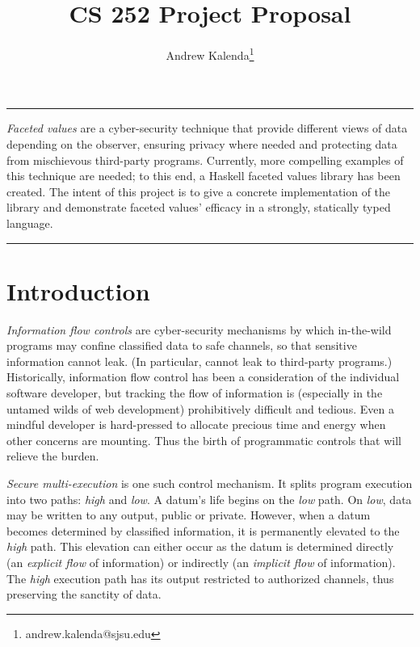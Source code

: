 \documentclass[12pt,a4paper]{article}
\renewenvironment{abstract}{%
	\hfill\begin{minipage}{0.95\textwidth}
		\rule{\textwidth}{1pt}}
	{\par\noindent\rule{\textwidth}{1pt}\end{minipage}}
\begin{document}
	\title{CS 252 Project Proposal}
	\author[1]{Andrew Kalenda\thanks{andrew.kalenda@sjsu.edu}}
	\maketitle
	\begin{abstract}
		\textit{Faceted values} are a cyber-security technique that provide different views of data depending on the observer, ensuring privacy where needed and protecting data from mischievous third-party programs. Currently, more compelling examples of this technique are needed; to this end, a Haskell faceted values library has been created. The intent of this project is to give a concrete implementation of the library and demonstrate faceted values' efficacy in a strongly, statically typed language.
	\end{abstract}
	
	\section{Introduction}
		\textit{Information flow controls}\cite{DenningDenning1977} are cyber-security mechanisms by which in-the-wild programs may confine classified data to safe channels, so that sensitive information cannot leak. (In particular, cannot leak to third-party programs.) Historically, information flow control has been a consideration of the individual software developer, but tracking the flow of information is (especially in the untamed wilds of web development) prohibitively difficult and tedious. Even a mindful developer is hard-pressed to allocate precious time and energy when other concerns are mounting. Thus the birth of programmatic controls that will relieve the burden.
		
		\textit{Secure multi-execution}\cite{DevriesePiessens2010, JaskelioffRusso2012, RafnssonSabelfeld2013} is one such control mechanism. It splits program execution into two paths: \textit{high} and \textit{low}. A datum's life begins on the \textit{low} path. On \textit{low}, data may be written to any output, public or private. However, when a datum becomes determined by classified information, it is permanently elevated to the \textit{high} path. This elevation can either occur as the datum is determined directly (an \textit{explicit flow} of information) or indirectly (an \textit{implicit flow} of information). The \textit{high} execution path has its output restricted to authorized channels, thus preserving the sanctity of data. 
		
\end{document}
